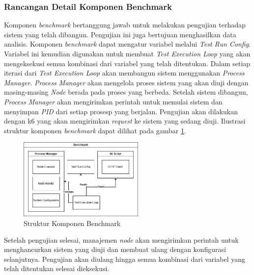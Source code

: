 \subsubsection{Rancangan Detail Komponen Benchmark}
\label{subsubsection:detail-data-benchmark}

Komponen \textit{benchmark} bertanggung jawab untuk melakukan pengujian terhadap sistem yang telah dibangun. Pengujian ini juga bertujuan menghasilkan data analisis. Komponen \textit{benchmark} dapat mengatur variabel melalui \textit{Test Run Config}. Variabel ini kemudian digunakan untuk membuat \textit{Test Execution Loop} yang akan mengeksekusi semua kombinasi dari variabel yang telah ditentukan. Dalam setiap iterasi dari \textit{Test Execution Loop} akan membangun sistem menggunakan \textit{Process Manager}. \textit{Process Manager} akan mengelola proses sistem yang akan diuji dengan masing-masing \textit{Node} berada pada proses yang berbeda. Setelah sistem dibangun, \textit{Process Manager} akan mengirimkan perintah untuk memulai sistem dan menyimpan \textit{PID} dari setiap prosesp yang berjalan. Pengujian akan dilakukan dengan k6 yang akan mengirimkan \textit{request} ke sistem yang sedang diuji. Ilustrasi struktur komponen \textit{benchmark} dapat dilihat pada gambar \ref{fig:benchmark-structure}.

\begin{figure}[ht]
    \centering
    \includegraphics[width=0.55\textwidth]{resources/chapter-3/benchmark-architecture.png}
    \caption{Struktur Komponen Benchmark}
    \label{fig:benchmark-structure}
\end{figure}

Setelah pengujian selesai, manajemen \textit{node} akan mengirimkan perintah untuk menghancurkan sistem yang diuji dan membuat ulang dengan konfigurasi selanjutnya. Pengujian akan diulang hingga semua kombinasi dari variabel yang telah ditentukan selesai dieksekusi.